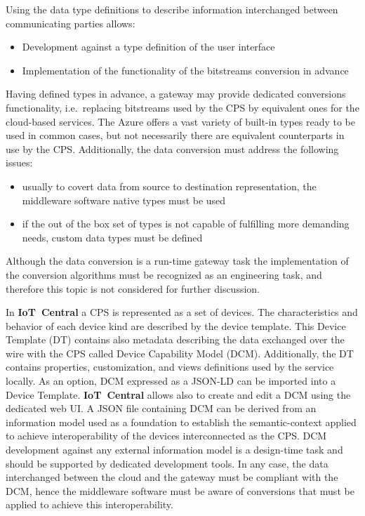 \documentclass{article}
\begin{document}
Using the data type definitions to describe information interchanged
between communicating parties allows:

\begin{itemize}
      \item Development against a type definition of the user interface
      \item Implementation of the functionality of the bitstreams conversion in advance
\end{itemize}

Having defined types in advance, a gateway may provide dedicated conversions functionality, i.e.~replacing bitstreams used by the CPS by equivalent ones for the cloud-based services. The Azure offers a vast variety of built-in types ready to be used in common cases, but not necessarily there are equivalent counterparts in use by the CPS. Additionally, the data conversion must address the following issues:

\begin{itemize}
      \item usually to covert data from source to destination representation, the middleware software native types must be used
      \item if the out of the box set of types is not capable of fulfilling more demanding needs, custom data types must be defined
\end{itemize}

Although the data conversion is a run-time gateway task the
implementation of the conversion algorithms must be recognized as an
engineering task, and therefore this topic is not considered for further
discussion.

In \textbf{IoT\ Central} a CPS is represented as a set
of devices. The characteristics and behavior of each device kind are
described by the device template. This Device Template (DT) contains
also metadata describing the data exchanged over the
wire with the CPS called Device Capability Model
(DCM). Additionally, the DT contains properties, customization, and
views definitions used by the service locally. As an option, DCM
expressed as a JSON-LD can be imported into a Device Template.
\textbf{IoT\ Central} allows also to create and edit a DCM using the
dedicated web UI. A JSON file containing DCM can be derived from an
information model used as a foundation to establish the semantic-context
applied to achieve interoperability of the devices interconnected as the
CPS. DCM development against any external information
model is a design-time task and should be supported by dedicated
development tools. In any case, the data interchanged between the cloud
and the gateway must be compliant with the DCM, hence the middleware
software must be aware of conversions that must be applied to achieve
this interoperability.
\end{document}
